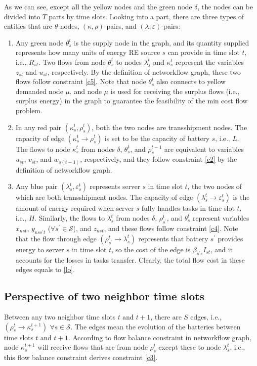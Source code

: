 \documentclass[conference, 10pt, ﬁnal, letterpaper, twocolumn]{IEEEtran}
\begin{document}
As we can see, except all the yellow nodes and the green node $\delta$, the nodes can be divided into $T$ parts by time slots. Looking into a part, there are three types of entities that are $\theta$-nodes, $(\kappa, \rho)$-pairs, and $(\lambda, \varepsilon)$-pairs:
\begin{enumerate}
    \item Any green node $\theta^{t}_{s}$ is the supply node in the graph, and its quantity supplied represents how many units of energy RE source $s$ can provide in time slot $t$, i.e., $R_{st}$. Two flows from node $\theta^{t}_{s}$ to nodes $\lambda^{t}_{s}$ and $\kappa^{t}_{s}$ represent the variables $z_{st}$ and $u_{st}$, respectively. By the definition of networkflow graph, these two flows follow constraint \eqref{c5}. Note that node $\theta^{t}_{s}$ also connects to yellow demanded node $\mu$, and node $\mu$ is used for receiving the surplus flows (i.e., surplus energy) in the graph to guarantee the feasibility of the min cost flow problem.
    \item In any red pair $(\kappa^{t}_{s}, \rho^{t}_{s})$, both the two nodes are transshipment nodes. The capacity of edge $(\kappa^{t}_{s}\rightarrow \rho^{t}_{s})$ is set to be the capacity of battery $s$, i.e., $L$. The flows to node $\kappa^{t}_{s}$ from nodes $\delta$, $\theta^{t}_{s}$, and $\rho^{t-1}_{s}$ are equivalent to variables $u_{st}$, $v_{st}$, and $w_{s(t-1)}$, respectively, and they follow constraint \eqref{c2} by the definition of networkflow graph.
    \item Any blue pair $(\lambda^{t}_{s}, \varepsilon^{t}_{s})$ represents server $s$ in time slot $t$, the two nodes of which are both transshipment nodes. The capacity of edge $(\lambda^{t}_{s}\rightarrow\varepsilon^{t}_{s})$ is the amount of energy required when server $s$ fully handles tasks in time slot $t$, i.e., $H$. Similarly, the flows to $\lambda^{t}_{s}$ from nodes $\delta$, $\rho^{t}_{s^\prime}$, and $\theta^{t}_{s}$ represent variables $x_{nst}$, $y_{nss^\prime t}$ ($\forall s^\prime \in \mathcal{S}$), and $z_{nst}$, and these flows follow constraint \eqref{c4}. Note that the flow through edge $(\rho^{t}_{s^\prime}\rightarrow\lambda^{t}_{s})$ represents that battery $s^\prime$ provides energy to server $s$ in time slot $t$, so the cost of the edge is $\beta_{s^\prime s} I_{st}$, and it accounts for the losses in tasks transfer. Clearly, the total flow cost in these edges equals to \eqref{lo}.
\end{enumerate}

\subsection{Perspective of two neighbor time slots}
Between any two neighbor time slots $t$ and $t+1$, there are $S$ edges, i.e., $(\rho^{t}_{s}\rightarrow\kappa^{t+1}_{s})$ $\forall s\in \mathcal{S}$. The edges mean the evolution of the batteries between time slots $t$ and $t+1$. According to flow balance constraint in networkflow graph, node $\kappa^{t+1}_{s}$ will receive flows that are from node $\rho^{t}_{s}$ except these to node $\lambda^{t}_{s}$, i.e., this flow balance constraint derives constraint \eqref{c3}.
\end{document}
